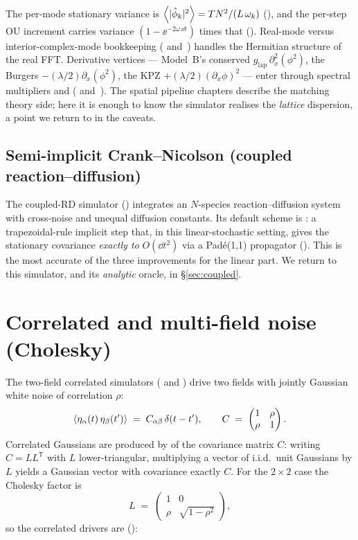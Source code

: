 The per-mode stationary variance is $\left\langle |\hat\phi_k|^{2} \right\rangle = T N^{2}/(L\,\omega_k)$
(), and the per-step OU increment carries
variance $(1 - \ee^{-2\omega\,\dd t})$ times that
(). Real-mode versus interior-complex-mode
bookkeeping ( and~)
handles the Hermitian structure of the real FFT. Derivative vertices --- Model~B's
conserved $g_{\mathrm{lap}}\,\partial_x^{2}(\phi^{2})$, the Burgers
$-(\lambda/2)\partial_x(\phi^{2})$, the KPZ $+(\lambda/2)(\partial_x\phi)^{2}$ ---
enter through spectral multipliers  and 
( and~). The spatial
pipeline chapters describe the matching theory side; here it is enough to know the
simulator realises the \emph{lattice} dispersion, a point we return to in the
caveats.

\subsection{Semi-implicit Crank--Nicolson (coupled reaction--diffusion)}

The coupled-RD simulator () integrates an
$N$-species reaction--diffusion system with cross-noise and unequal diffusion
constants. Its default scheme is : a
trapezoidal-rule implicit step that, in this linear-stochastic setting, gives the
stationary covariance \emph{exactly to} $O(\dd t^{2})$ via a Pad\'e(1,1)
propagator (). This is the most accurate of
the three improvements for the linear part. We return to this simulator, and its
\emph{analytic} oracle, in \S\ref{sec:coupled}.

\section{Correlated and multi-field noise (Cholesky)}

The two-field correlated simulators
( and
) drive two fields with
jointly Gaussian white noise of correlation $\rho$:
\[
  \left\langle \eta_\alpha(t)\,\eta_\beta(t') \right\rangle \;=\; C_{\alpha\beta}\,\delta(t-t'),
  \qquad
  C \;=\; \begin{pmatrix} 1 & \rho \\ \rho & 1 \end{pmatrix}.
\]
Correlated Gaussians are produced by  of the
covariance matrix $C$: writing $C = L L^{\mathsf T}$ with $L$ lower-triangular,
multiplying a vector of i.i.d.\ unit Gaussians by $L$ yields a Gaussian vector
with covariance exactly $C$. For the $2\times 2$ case the Cholesky factor is
\[
  L \;=\; \begin{pmatrix} 1 & 0 \\ \rho & \sqrt{1-\rho^{2}} \end{pmatrix},
\]
so the correlated drivers are ():

